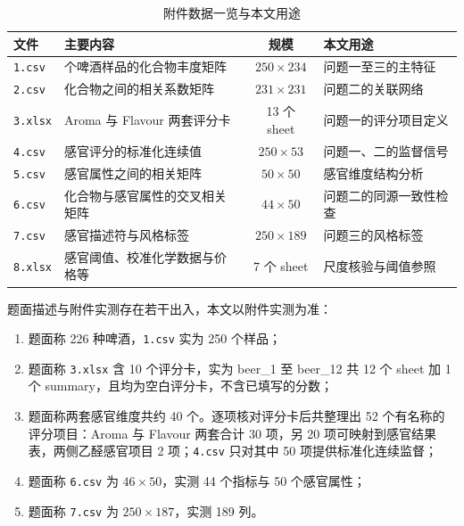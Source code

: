 \documentclass[UTF8,a4paper,zihao=-4]{ctexart}
\numberwithin{figure}{section}
\numberwithin{table}{section}
\numberwithin{equation}{section}
\newcommand{\file}[1]{\texttt{#1}}
\begin{document}
\begin{table}[H]
  \centering
  \caption{附件数据一览与本文用途}
  \label{tab:data}
  \small
  \begin{tabularx}{\textwidth}{@{}l >{\hsize=1.2\hsize}X c >{\hsize=0.8\hsize}X@{}}
    \toprule
    文件 & 主要内容 & 规模 & 本文用途 \\
    \midrule
    \file{1.csv} & 250 个啤酒样品的化合物丰度矩阵 & $250\!\times\!234$ & 问题一至三的主特征 \\
    \file{2.csv} & 化合物之间的相关系数矩阵 & $231\!\times\!231$ & 问题二的关联网络 \\
    \file{3.xlsx} & Aroma 与 Flavour 两套评分卡 & 13 个 sheet & 问题一的评分项目定义 \\
    \file{4.csv} & 感官评分的标准化连续值 & $250\!\times\!53$ & 问题一、二的监督信号 \\
    \file{5.csv} & 感官属性之间的相关矩阵 & $50\!\times\!50$ & 感官维度结构分析 \\
    \file{6.csv} & 化合物与感官属性的交叉相关矩阵 & $44\!\times\!50$ & 问题二的同源一致性检查 \\
    \file{7.csv} & 感官描述符与风格标签 & $250\!\times\!189$ & 问题三的风格标签 \\
    \file{8.xlsx} & 感官阈值、校准化学数据与价格等 & 7 个 sheet & 尺度核验与阈值参照 \\
    \bottomrule
  \end{tabularx}
\end{table}

题面描述与附件实测存在若干出入，本文以附件实测为准：

\begin{enumerate}[label=（\arabic*）,leftmargin=2.5em,itemsep=0pt,topsep=2pt,parsep=0pt]
  \item 题面称 226 种啤酒，\file{1.csv} 实为 250 个样品；
  \item 题面称 \file{3.xlsx} 含 10 个评分卡，实为 beer\_1 至 beer\_12 共 12 个 sheet 加 1 个 summary，且均为空白评分卡，不含已填写的分数；
  \item 题面称两套感官维度共约 40 个。逐项核对评分卡后共整理出 52 个有名称的评分项目：Aroma 与 Flavour 两套合计 30 项，另 20 项可映射到感官结果表，两侧乙醛感官项目 2 项；\file{4.csv} 只对其中 50 项提供标准化连续监督；
  \item 题面称 \file{6.csv} 为 $46\!\times\!50$，实测 44 个指标与 50 个感官属性；
  \item 题面称 \file{7.csv} 为 $250\!\times\!187$，实测 189 列。
\end{enumerate}
\end{document}
